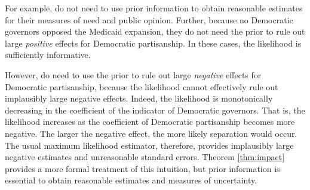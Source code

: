 \documentclass[12pt]{article}
\begin{document}
For example, \cite{BarrilleauxRainey2014} do not need to use prior information to obtain reasonable estimates for their measures of need and public opinion. 
Further, because no Democratic governors opposed the Medicaid expansion, they do not need the prior to rule out large \textit{positive} effects for Democratic partisanship. 
In these cases, the likelihood is sufficiently informative. 

However, \cite{BarrilleauxRainey2014} do need to use the prior to rule out large \textit{negative} effects for Democratic partisanship, because the likelihood cannot effectively rule out implausibly large negative effects. 
Indeed, the likelihood is monotonically decreasing in the coefficient of the indicator of Democratic governors. 
That is, the likelihood increases as the coefficient of Democratic partisanship becomes more negative. 
The larger the negative effect, the more likely separation would occur. 
The usual maximum likelihood estimator, therefore, provides implausibly large negative estimates and unreasonable standard errors. 
Theorem \ref{thm:impact} provides a more formal treatment of this intuition, but prior information is essential to obtain reasonable estimates and measures of uncertainty. 
\end{document}
